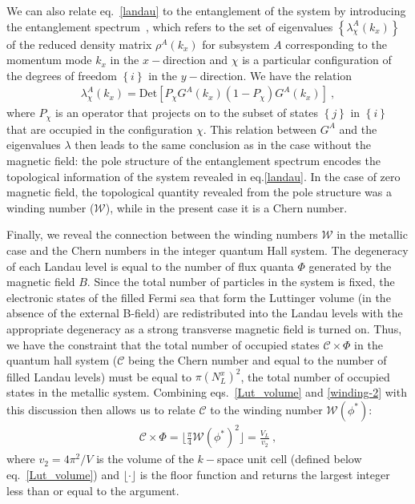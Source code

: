 We can also relate eq.~\eqref{landau} to the entanglement of the system by introducing the entanglement spectrum~\cite{li2008entanglement,laflorencie2016quantum}, which refers to the set of eigenvalues \(\left\{ \lambda_\chi^A(k_x) \right\} \) of the reduced density matrix \(\rho^A(k_x)\) for subsystem \(A\) corresponding to the momentum mode \(k_x\) in the \(x-\)direction and \(\chi\) is a particular configuration of the degrees of freedom \(\left\{ i \right\} \) in the \(y-\)direction.
We have the relation~\cite{Alexandradinata2011}
\begin{equation}\begin{aligned}
	\lambda^A_\chi(k_x) = \text{Det}\left[P_\chi G^A(k_x) \left( 1 - P_\chi \right) G^A(k_x)\right] ~,
\end{aligned}\end{equation}
where \(P_\chi\) is an operator that projects on to the subset of states \(\left\{ j \right\} \) in \(\left\{ i \right\} \) that are occupied in the configuration \(\chi\).
This relation between \(G^A\) and the eigenvalues \(\lambda\) then leads to the same conclusion as in the case without the magnetic field: the pole structure of the entanglement spectrum encodes the topological information of the system revealed in eq.\eqref{landau}. In the case of zero magnetic field, the topological quantity revealed from the pole structure was a winding number ($\mathcal{W}$), while in the present case it is a Chern number.

Finally, we reveal the connection between the winding numbers $\mathcal{W}$ in the metallic case and the Chern numbers in the integer quantum Hall system. The degeneracy of each Landau level is equal to the number of flux quanta \(\Phi\) generated by the magnetic field \(B\).
Since the total number of particles in the system is fixed, the electronic states of the filled Fermi sea that form the Luttinger volume (in the absence of the external B-field) are redistributed into the Landau levels with the appropriate degeneracy as a strong transverse magnetic field is turned on. Thus, we have the constraint that the total number of occupied states \(\mathcal{C} \times \Phi\) in the quantum hall system (\(\mathcal{C}\) being the Chern number and equal to the number of filled Landau levels) must be equal to \(\pi \left(N_L^x\right)^2 \), the total number of occupied states in the metallic system. Combining eqs.~\ref{Lut_volume} and \ref{winding-2} with this discussion then allows us to relate $\mathcal{C}$ to the winding number $\mathcal{W}(\phi^*)$:
\begin{equation}\begin{aligned}
	\mathcal{C} \times \Phi = \bigg\lfloor \frac{\pi}{4}\mathcal{W}(\phi^*)^2\bigg\rfloor = \frac{V_L}{v_2}~,
\end{aligned}\end{equation}
where \(v_2 = 4\pi^2/V\) is the volume of the \(k-\)space unit cell (defined below eq.~\eqref{Lut_volume}) and \(\lfloor \cdot \rfloor\) is the floor function and returns the largest integer less than or equal to the argument. 

